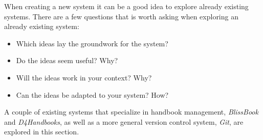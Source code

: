When creating a new system it can be a good idea to explore already existing systems.%
There are a few questions that is worth asking when exploring an already existing system:

\begin{itemize}
  \item Which ideas lay the groundwork for the system?
  \item Do the ideas seem useful? Why?
  \item Will the ideas work in your context? Why?
  \item Can the ideas be adapted to your system? How?
\end{itemize}


A couple of existing systems that specialize in handbook management, \textit{BlissBook} and \textit{D4Handbooks}, as well as a more general version control system, \textit{Git}, are explored in this section.
